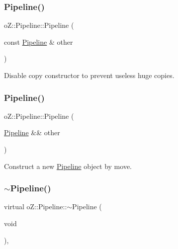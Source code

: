 \subsubsection{\texorpdfstring{Pipeline()}{Pipeline()}\hspace{0.1cm}{\footnotesize\ttfamily [2/3]}}
{\footnotesize\ttfamily o\+Z\+::\+Pipeline\+::\+Pipeline (\begin{DoxyParamCaption}\item[{const \mbox{\hyperlink{classo_z_1_1_pipeline}{Pipeline}} \&}]{other }\end{DoxyParamCaption})\hspace{0.3cm}{\ttfamily [delete]}}



Disable copy constructor to prevent useless huge copies. 

\mbox{\label{classo_z_1_1_pipeline_a6f9e61063bafb53108f1058f3de8c56a}} 
\subsubsection{\texorpdfstring{Pipeline()}{Pipeline()}\hspace{0.1cm}{\footnotesize\ttfamily [3/3]}}
{\footnotesize\ttfamily o\+Z\+::\+Pipeline\+::\+Pipeline (\begin{DoxyParamCaption}\item[{\mbox{\hyperlink{classo_z_1_1_pipeline}{Pipeline}} \&\&}]{other }\end{DoxyParamCaption})\hspace{0.3cm}{\ttfamily [default]}}



Construct a new \mbox{\hyperlink{classo_z_1_1_pipeline}{Pipeline}} object by move. 

\mbox{\label{classo_z_1_1_pipeline_a91969687e5d9dccb384febbce62d5dd9}} 
\subsubsection{\texorpdfstring{$\sim$Pipeline()}{~Pipeline()}}
{\footnotesize\ttfamily virtual o\+Z\+::\+Pipeline\+::$\sim$\+Pipeline (\begin{DoxyParamCaption}\item[{void}]{ }\end{DoxyParamCaption})\hspace{0.3cm}{\ttfamily [virtual]}, {\ttfamily [default]}}



